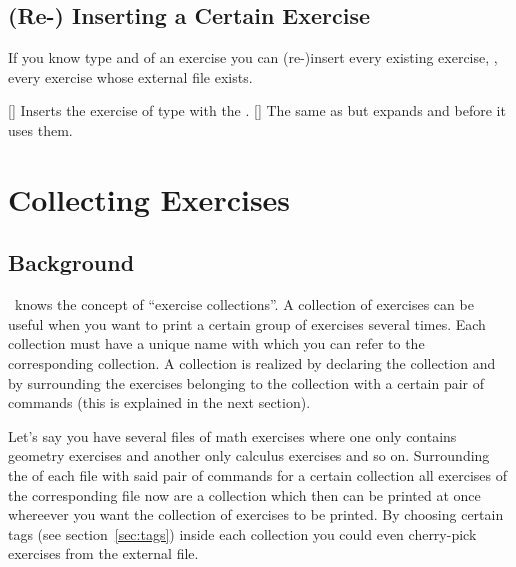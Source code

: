 \documentclass{xsim-manual}
\begin{document}
\subsection{(Re-) Inserting a Certain Exercise}
If you know type and  of an exercise you can (re-)insert every
existing exercise, \ie, every exercise whose external file exists.
\begin{commands}
  []
    Inserts the exercise of type  with the 
    .
  []
    The same as  but expands 
    and  before it uses them.
\end{commands}
\begin{example}
\end{example}

\section{Collecting Exercises}\label{sec:collecting-exercises}

\subsection{Background}
\xsim\ knows the concept of \enquote{exercise collections}.  A collection of
exercises can be useful when you want to print a certain group of exercises
several times.  Each collection must have a unique name with which you can
refer to the corresponding collection.  A collection is realized by declaring
the collection and by surrounding the exercises belonging to the collection
with a certain pair of commands (this is explained in the next section).

Let's say you have several files of math exercises where one only contains
geometry exercises and another only calculus exercises and so on.  Surrounding
the  of each file with said pair of commands for a certain
collection all exercises of the corresponding file now are a collection which
then can be printed at once whereever you want the collection of exercises to
be printed.  By choosing certain tags (see section~\vref{sec:tags}) inside
each collection you could even cherry-pick exercises from the external file.
\end{document}
